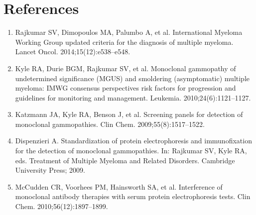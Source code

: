 \section*{References}
\begin{enumerate}
  \item Rajkumar SV, Dimopoulos MA, Palumbo A, et al. International Myeloma Working Group updated criteria for the diagnosis of multiple myeloma. Lancet Oncol. 2014;15(12):e538--e548.
  \item Kyle RA, Durie BGM, Rajkumar SV, et al. Monoclonal gammopathy of undetermined significance (MGUS) and smoldering (asymptomatic) multiple myeloma: IMWG consensus perspectives risk factors for progression and guidelines for monitoring and management. Leukemia. 2010;24(6):1121--1127.
  \item Katzmann JA, Kyle RA, Benson J, et al. Screening panels for detection of monoclonal gammopathies. Clin Chem. 2009;55(8):1517--1522.
  \item Dispenzieri A. Standardization of protein electrophoresis and immunofixation for the detection of monoclonal gammopathies. In: Rajkumar SV, Kyle RA, eds. Treatment of Multiple Myeloma and Related Disorders. Cambridge University Press; 2009.
  \item McCudden CR, Voorhees PM, Hainsworth SA, et al. Interference of monoclonal antibody therapies with serum protein electrophoresis tests. Clin Chem. 2010;56(12):1897--1899.
\end{enumerate}

\clearpage
